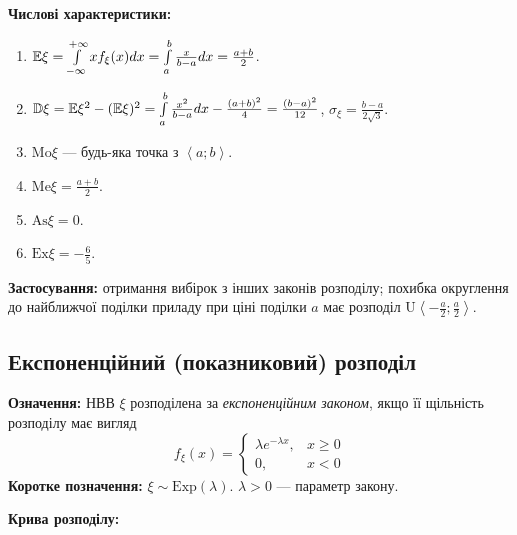 \noindent\textbf{Числові характеристики:}
\begin{enumerate}
    \item $\mathbb{E}\xi = \int\limits_{-\infty}^{+\infty} x f_\xi(x)dx = \int\limits_{a}^{b} \frac{x}{b-a}dx = \frac{a+b}{2}$.
    \item $\mathbb{D}\xi = \mathbb{E}\xi^2 - (\mathbb{E}\xi)^2 = \int\limits_{a}^{b} \frac{x^2}{b-a}dx - \frac{(a+b)^2}{4} = \frac{(b-a)^2}{12}$, $\sigma_\xi = \frac{b-a}{2\sqrt{3}}$.
    \item $\mathrm{Mo}\xi$ --- будь-яка точка з $\left<a; b\right>$.
    \item $\mathrm{Me}\xi = \frac{a+b}{2}$.
    \item $\mathrm{As}\xi = 0$.
    \item $\mathrm{Ex}\xi = -\frac{6}{5}$.
\end{enumerate}

\noindent\textbf{Застосування:} отримання вибірок з інших законів розподілу;
похибка округлення до найближчої поділки приладу при ціні поділки $a$ має розподіл $\mathrm{U}\left<-\frac{a}{2}; \frac{a}{2}\right>$.

\subsection{Експоненційний (показниковий) розподіл}
\noindent\textbf{Означення:}
    НВВ $\xi$ розподілена за \emph{експоненційним законом}, 
    якщо її щільність розподілу має вигляд \begin{equation}
        f_\xi(x) = \begin{cases}
            \lambda e^{-\lambda x}, & x \geq 0 \\
            0, & x < 0
        \end{cases}
    \end{equation}
\textbf{Коротке позначення:} $\xi \sim \mathrm{Exp}(\lambda)$.
    $\lambda > 0$ --- параметр закону.

\noindent \textbf{Крива розподілу:}
\begin{center}
\end{center}

